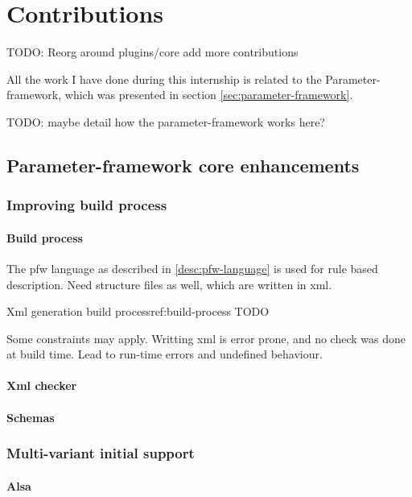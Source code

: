 \chapter{Contributions}\label{chap:contributions}

TODO:
Reorg around plugins/core add more contributions

\begin{sectionIntro}
    All the work I have done during this internship is related
    to the Parameter-framework, which was presented in section \ref{sec:parameter-framework}.

    TODO: maybe detail how the parameter-framework works here?
\end{sectionIntro}

\section{Parameter-framework core enhancements}

\subsection{Improving build process}
\subsubsection{Build process}
The pfw language as described in \ref{desc:pfw-language} is used for rule based
description. Need structure files as well, which are written in \gls{xml}.

\begin{figureGraphics}{Xml generation build process}{ref:build-process}
    TODO
\end{figureGraphics}

Some constraints may apply. Writting \gls{xml} is error prone, and no check was done at
build time. Lead to run-time errors and undefined behaviour.
\subsubsection{Xml checker}
\subsubsection{Schemas}


\subsection{Multi-variant initial support}
\subsubsection{Alsa}
